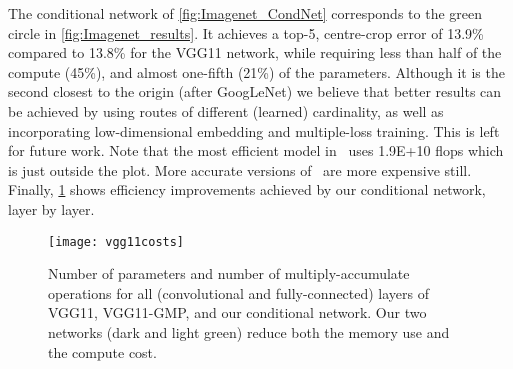 \documentclass[thesis]{subfiles}
\begin{document}
	The conditional network of \cref{fig:Imagenet_CondNet} 
	corresponds to the green circle in \cref{fig:Imagenet_results}.
	It achieves a top-5, centre-crop error of
	13.9\% compared to 13.8\% for the VGG11 network, while requiring less than half of the compute (45\%),
	and almost one-fifth (21\%) of the parameters.
	Although it is the second closest to the origin (after GoogLeNet) we believe that better results can be achieved 
	by using routes of different (learned) cardinality, as well as incorporating low-dimensional embedding and multiple-loss training. This is left for future work. 
	Note that the most efficient model in~\citep{He2015b} uses 1.9E+10 flops which is just outside the plot. 
	More accurate versions of~\citep{He2015b} are more expensive still.
	Finally, \cref{fig:VggPerLayerCost} shows efficiency improvements achieved by our conditional network, layer by layer.
	
	\begin{figure}[tbp]
		\centering
		\texttt{[image: vgg11costs]}
		\caption[Cost of VGG11-based networks per layer]{
			Number of parameters and number of multiply-accumulate operations for all (convolutional and fully-connected) 
			layers of VGG11, VGG11-GMP, and our conditional network. Our two networks (dark and light green) 
			reduce both the memory use and the compute cost.}
		\label{fig:VggPerLayerCost}
	\end{figure}
	
	
	
	
	
	
\end{document}
